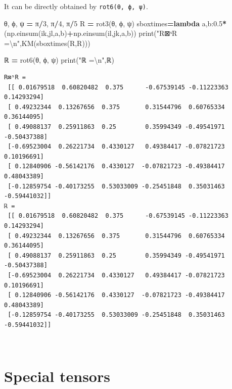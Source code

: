 \documentclass[
  a4paper,
  numbers=noendperiod,
  DIV=12]{scrreprt}
\newenvironment{Shaded}{\begin{snugshade}}{\end{snugshade}}
\newcommand{\BuiltInTok}[1]{#1}
\newcommand{\CharTok}[1]{\textcolor[rgb]{0.31,0.60,0.02}{#1}}
\newcommand{\DecValTok}[1]{\textcolor[rgb]{0.00,0.00,0.81}{#1}}
\newcommand{\FloatTok}[1]{\textcolor[rgb]{0.00,0.00,0.81}{#1}}
\newcommand{\KeywordTok}[1]{\textcolor[rgb]{0.13,0.29,0.53}{\textbf{#1}}}
\newcommand{\NormalTok}[1]{#1}
\newcommand{\OperatorTok}[1]{\textcolor[rgb]{0.81,0.36,0.00}{\textbf{#1}}}
\newcommand{\StringTok}[1]{\textcolor[rgb]{0.31,0.60,0.02}{#1}}
\begin{document}
It can be directly obtained by \texttt{rot6(θ,\ ϕ,\ ψ)}.

\begin{Shaded}
\begin{Highlighting}[]
\NormalTok{θ, ϕ, ψ }\OperatorTok{=}\NormalTok{ π}\OperatorTok{/}\DecValTok{3}\NormalTok{, π}\OperatorTok{/}\DecValTok{4}\NormalTok{, π}\OperatorTok{/}\DecValTok{5}
\NormalTok{R }\OperatorTok{=}\NormalTok{ rot3(θ, ϕ, ψ)}
\NormalTok{sboxtimes}\OperatorTok{=}\KeywordTok{lambda}\NormalTok{ a,b:}\FloatTok{0.5}\OperatorTok{*}\NormalTok{(np.einsum(}\StringTok{\textquotesingle{}ik,jl\textquotesingle{}}\NormalTok{,a,b)}\OperatorTok{+}\NormalTok{np.einsum(}\StringTok{\textquotesingle{}il,jk\textquotesingle{}}\NormalTok{,a,b))}
\BuiltInTok{print}\NormalTok{(}\StringTok{"R⊠ˢR =}\CharTok{\textbackslash{}n}\StringTok{"}\NormalTok{,KM(sboxtimes(R,R)))}

\NormalTok{ℝ }\OperatorTok{=}\NormalTok{ rot6(θ, ϕ, ψ)}
\BuiltInTok{print}\NormalTok{(}\StringTok{"ℝ =}\CharTok{\textbackslash{}n}\StringTok{"}\NormalTok{,ℝ)}
\end{Highlighting}
\end{Shaded}

\begin{verbatim}
R⊠ˢR =
 [[ 0.01679518  0.60820482  0.375      -0.67539145 -0.11223363  0.14293294]
 [ 0.49232344  0.13267656  0.375       0.31544796  0.60765334  0.36144095]
 [ 0.49088137  0.25911863  0.25        0.35994349 -0.49541971 -0.50437388]
 [-0.69523004  0.26221734  0.4330127   0.49384417 -0.07821723  0.10196691]
 [ 0.12840906 -0.56142176  0.4330127  -0.07821723 -0.49384417  0.48043389]
 [-0.12859754 -0.40173255  0.53033009 -0.25451848  0.35031463 -0.59441032]]
ℝ =
 [[ 0.01679518  0.60820482  0.375      -0.67539145 -0.11223363  0.14293294]
 [ 0.49232344  0.13267656  0.375       0.31544796  0.60765334  0.36144095]
 [ 0.49088137  0.25911863  0.25        0.35994349 -0.49541971 -0.50437388]
 [-0.69523004  0.26221734  0.4330127   0.49384417 -0.07821723  0.10196691]
 [ 0.12840906 -0.56142176  0.4330127  -0.07821723 -0.49384417  0.48043389]
 [-0.12859754 -0.40173255  0.53033009 -0.25451848  0.35031463 -0.59441032]]
\end{verbatim}

\(\,\)

\chapter{Special tensors}\label{sec-special_tensors}
\end{document}
